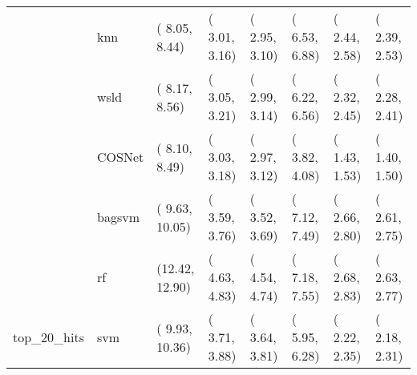 \begin{table}[H]
{\begin{tabular}{llllllll}
 & knn & ( 8.05,  8.44) & ( 3.01,  3.16) & ( 2.95,  3.10) & ( 6.53,  6.88) & ( 2.44,  2.58) & ( 2.39,  2.53)\\

 & wsld & ( 8.17,  8.56) & ( 3.05,  3.21) & ( 2.99,  3.14) & ( 6.22,  6.56) & ( 2.32,  2.45) & ( 2.28,  2.41)\\

 & COSNet & ( 8.10,  8.49) & ( 3.03,  3.18) & ( 2.97,  3.12) & ( 3.82,  4.08) & ( 1.43,  1.53) & ( 1.40,  1.50)\\

 & bagsvm & ( 9.63, 10.05) & ( 3.59,  3.76) & ( 3.52,  3.69) & ( 7.12,  7.49) & ( 2.66,  2.80) & ( 2.61,  2.75)\\

 & rf & (12.42, 12.90) & ( 4.63,  4.83) & ( 4.54,  4.74) & ( 7.18,  7.55) & ( 2.68,  2.83) & ( 2.63,  2.77)\\

\multirow{-15}{*}{\raggedright\arraybackslash top\_20\_hits} & svm & ( 9.93, 10.36) & ( 3.71,  3.88) & ( 3.64,  3.81) & ( 5.95,  6.28) & ( 2.22,  2.35) & ( 2.18,  2.31)\\
\bottomrule
\end{tabular}}
\end{table}
